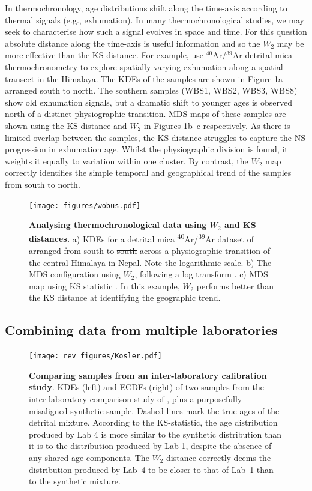 \documentclass[gchron, manuscript]{copernicus}
\providecommand{\DIFaddtex}[1]{{\protect\color{blue}\uwave{#1}}} %
\providecommand{\DIFdeltex}[1]{{\protect\color{red}\sout{#1}}}                      %
\providecommand{\DIFaddFL}[1]{\DIFadd{#1}} %
\providecommand{\DIFdelFL}[1]{\DIFdel{#1}} %
\providecommand{\DIFaddbeginFL}{} %
\providecommand{\DIFaddendFL}{} %
\providecommand{\DIFdelbeginFL}{} %
\providecommand{\DIFdelendFL}{} %
\providecommand{\DIFadd}[1]{\texorpdfstring{\DIFaddtex{#1}}{#1}} %
\providecommand{\DIFdel}[1]{\texorpdfstring{\DIFdeltex{#1}}{}} %
\begin{document}
In thermochronology, age distributions shift along the time-axis according to thermal signals (e.g., exhumation). In many thermochronological studies, we may seek to characterise how such a signal evolves in space and time. For this question absolute distance along the time-axis is useful information and so the $W_2$ may be more effective than the KS distance. For example, \citet{wobus_has_2003} use $^{40}$Ar/$^{39}$Ar detrital mica thermochronometry to explore spatially varying exhumation along a spatial transect in the Himalaya. The KDEs of the samples are shown in Figure \ref{fig:Wobus}a arranged south to north. The southern samples (WBS1, WBS2, WBS3, WBS8) show old exhumation signals, but a dramatic shift to younger ages is observed north of a distinct physiographic transition. MDS maps of these samples are shown using the KS distance and $W_2$ in Figures \ref{fig:Wobus}b--c respectively. As there is limited overlap between the samples, the KS distance struggles to capture the NS progression in exhumation age. Whilst the physiographic division is found, it weights it equally to variation within one cluster. By contrast, the $W_2$ map correctly identifies the simple temporal and geographical trend of the samples from south to north. 

\begin{figure}
    \centering
    \texttt{[image: figures/wobus.pdf]}
    \caption{\textbf{Analysing thermochronological data using $W_2$ and KS distances.} a) KDEs for a detrital mica \textsuperscript{40}Ar/\textsuperscript{39}Ar dataset of \citet{wobus_has_2003} arranged from south to \DIFdelbeginFL \DIFdelFL{south }\DIFdelendFL \DIFaddbeginFL \DIFaddFL{north }\DIFaddendFL across a physiographic transition of the central Himalaya in Nepal. Note the logarithmic scale. b) The MDS configuration using $W_2$, following a log transform \DIFaddbeginFL \DIFaddFL{(stress = 0.02)}\DIFaddendFL . c) MDS map using KS statistic \DIFaddbeginFL \DIFaddFL{(stress = 0.18)}\DIFaddendFL . In this example, $W_2$ performs better than the KS distance at identifying the geographic trend.}
    \label{fig:Wobus}
\end{figure}

\subsection{Combining data from multiple laboratories}

\begin{figure}
    \centering
    \texttt{[image: rev\_figures/Kosler.pdf]}
    \caption{\textbf{Comparing samples from an inter-laboratory calibration study}. KDEs (left) and ECDFs (right) of two samples from the inter-laboratory comparison study of \citep{kosler_u-pb_2013}, plus a purposefully misaligned synthetic sample. Dashed lines mark the true ages of the detrital mixture. According to the KS-statistic, the age distribution produced by Lab 4 is more similar to the synthetic distribution than it is to the distribution produced by Lab 1, despite the absence of any shared age components. The $W_2$ distance correctly deems the distribution produced by Lab~4 to be closer to that of Lab~1 than to the synthetic mixture.}
    \label{fig:interlab}
\end{figure}
\end{document}

